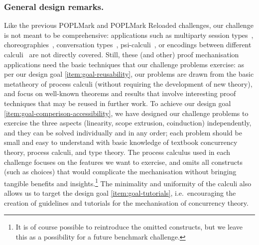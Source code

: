 \documentclass[runningheads]{llncs}
\begin{document}
\subsubsection{General design remarks.}
Like the previous POPLMark and POPLMark Reloaded challenges, our challenge is not meant to be comprehensive:
applications such as multiparty session types~\cite{10.1145/2827695,10.1145/3290343}, choreographies~\cite{DBLP:journals/jar/CruzFilipeMP23}, conversation types~\cite{DBLP:journals/tcs/CairesV10}, psi-calculi~\cite{lmcs:696}, or encodings between different calculi~\cite{DBLP:journals/iandc/Gorla10,DBLP:conf/forte/CairesP16,DBLP:journals/iandc/DardhaGS17,DBLP:conf/ecoop/ScalasDHY17,DBLP:journals/iandc/KouzapasPY19,10.1145/3479394.3479407} are not directly covered.  Still, these (and other) proof mechanisation applications need the basic techniques that our challenge problems exercise:
as per our design goal \ref{item:goal-reusability},
our problems are drawn from the basic metatheory of process calculi (without requiring the development of new theory), and focus on well-known theorems
and results that involve interesting proof techniques that may be reused in further work.
To achieve our design goal \ref{item:goal-comperison-accessibility},
we have designed our challenge problems to exercise the three aspects (linearity, scope extrusion, coinduction) independently, and they can be solved individually and in any order;
each problem should be small and easy to understand with basic knowledge of textbook concurrency theory, process calculi, and type theory.  The process calculus used in each challenge
focuses on the features we want to exercise, and omits all constructs
(such as choices) that would complicate the mechanisation without bringing tangible
benefits and insights.\footnote{It is of course possible to reintroduce the omitted
constructs, but we leave this as a possibility for a future benchmark challenge.}
The minimality and uniformity of the calculi also allows us to target the design
goal \ref{item:goal-tutorials}, i.e.~encouraging the creation of guidelines and
tutorials for the mechanisation of concurrency theory.


\end{document}
